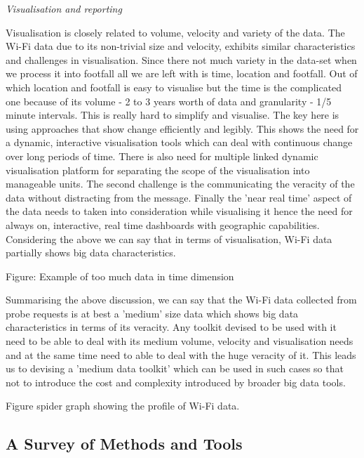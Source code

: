 \textit{Visualisation and reporting}

Visualisation is closely related to volume, velocity and variety of the data.
The Wi-Fi data due to its non-trivial size and velocity, exhibits similar characteristics and challenges in visualisation.
Since there not much variety in the data-set when we process it into footfall all we are left with is time, location and footfall.
Out of which location and footfall is easy to visualise but the time is the complicated one because of its volume - 2 to 3 years worth of data and granularity - 1/5 minute intervals.
This is really hard to simplify and visualise.
The key here is using approaches that show change efficiently and legibly.
This shows the need for a dynamic, interactive visualisation tools which can deal with continuous change over long periods of time.
There is also need for multiple linked dynamic visualisation platform for separating the scope of the visualisation into manageable units.
The second challenge is the communicating the veracity of the data without distracting from the message.
Finally the 'near real time' aspect of the data needs to taken into consideration while visualising it hence the need for always on, interactive, real time dashboards with geographic capabilities.
Considering the above we can say that in terms of visualisation, Wi-Fi data partially shows big data characteristics.

Figure: Example of too much data in time dimension

Summarising the above discussion, we can say that the Wi-Fi data collected from probe requests is at best a 'medium' size data which shows big data characteristics in terms of its veracity.
Any toolkit devised to be used with it need to be able to deal with its medium volume, velocity and visualisation needs and at the same time need to able to deal with the huge veracity of it.
This leads us to devising a 'medium data toolkit' which can be used in such cases so that not to introduce the cost and complexity introduced by broader big data tools.

Figure spider graph showing the profile of Wi-Fi data.


\subsection{A Survey of Methods and Tools}


